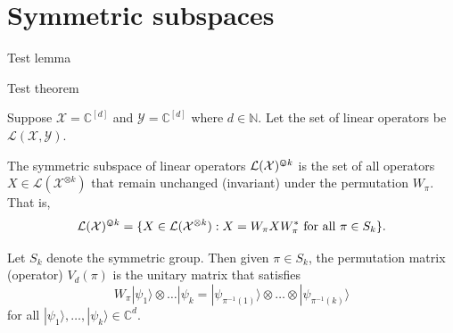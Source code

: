 \section{Symmetric subspaces}

\begin{lemma}\label{TestLemma}
  Test lemma
\end{lemma}

\begin{theorem}\label{TestTheorem}
  Test theorem
\end{theorem}

Suppose $\mathcal{X} = \mathbb{C}^{[d]}$ and $\mathcal{Y} = \mathbb{C}^{[d]}$ where $d \in \mathbb{N}$.
Let the set of linear operators be $\mathcal{L}(\mathcal{X}, \mathcal{Y})$.

\begin{definition}\label{def:sym_Lk}
  The {symmetric subspace of linear operators} $\mathcal{L}(\mathcal{X})^{\varovee k}$ is the set of all operators $X \in \mathcal{L}(\mathcal{X}^{\otimes k})$ that remain unchanged (invariant) under the permutation $W_{\pi}$.
That is,
\begin{equation}
    \mathcal{L}(\mathcal{X})^{\varovee k} = \{X \in \mathcal{L}(\mathcal{X}^{\otimes k}) : X = W_{\pi} X W_{\pi}^{*} \text{ for all } \pi \in S_{k} \}.
    \label{eq:sym_Lk}
\end{equation}

\end{definition}

\begin{remark}
Let $S_k$ denote the symmetric group. Then given $\pi \in S_k$, the permutation matrix (operator) $V_d(\pi)$ is the unitary matrix that satisfies
\begin{equation}\label{eq:permutation}
    W_{\pi} |\psi_1 \rangle \otimes \dots |\psi_k = |\psi_{\pi^{-1}(1)}\rangle \otimes \dots \otimes |\psi_{\pi^{-1}(k)}\rangle
\end{equation}
for all $|\psi_1 \rangle, \dots, |\psi_k\rangle \in \mathbb{C}^{d}$.
\end{remark}
